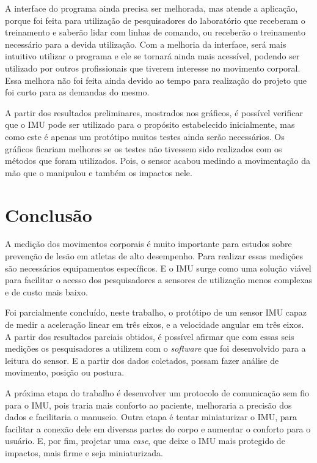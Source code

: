 	A interface do programa ainda precisa ser melhorada, mas atende a aplicação, porque foi feita para utilização de pesquisadores do laboratório que receberam o treinamento e saberão lidar com linhas de comando, ou receberão o treinamento necessário para a devida utilização. Com a melhoria da interface, será mais intuitivo utilizar o programa e ele se tornará ainda mais acessível, podendo ser utilizado por outros profissionais que tiverem interesse no movimento corporal. Essa melhora não foi feita ainda devido ao tempo para realização do projeto que foi curto para as demandas do mesmo.
	
	 A partir dos resultados preliminares, mostrados nos gráficos, é possível verificar que o IMU pode ser utilizado para o propósito estabelecido inicialmente, mas como este é apenas um protótipo muitos testes ainda serão necessários. Os gráficos ficariam melhores se os testes não tivessem sido realizados com os métodos que foram utilizados. Pois, o sensor acabou medindo a movimentação da mão que o manipulou e também os impactos nele.
	
\chapter{Conclusão}
	
	A medição dos movimentos corporais é muito importante para estudos sobre prevenção de lesão em atletas de alto desempenho. Para realizar essas medições são necessários equipamentos específicos. E o IMU surge como uma solução viável para facilitar o acesso dos pesquisadores a sensores de utilização menos complexas e de custo mais baixo. 
	
	Foi parcialmente concluído, neste trabalho, o protótipo de um sensor IMU capaz de medir a aceleração linear em três eixos, e a velocidade angular em três eixos. A partir dos resultados parciais obtidos, é possível afirmar que com essas seis medições os pesquisadores a utilizem com o \textit{software} que foi desenvolvido para a leitura do sensor.  E a partir dos dados coletados, possam fazer análise de movimento, posição ou postura.
	
	A próxima etapa do trabalho é desenvolver um protocolo de comunicação sem fio para o IMU, pois traria mais conforto ao paciente, melhoraria a precisão dos dados e facilitaria o manuseio. Outra etapa é tentar miniaturizar o IMU, para facilitar a conexão dele em diversas partes do corpo e aumentar o conforto para o usuário. E, por fim, projetar uma \textit{case}, que deixe o IMU mais protegido de impactos, mais firme e seja miniaturizada. 